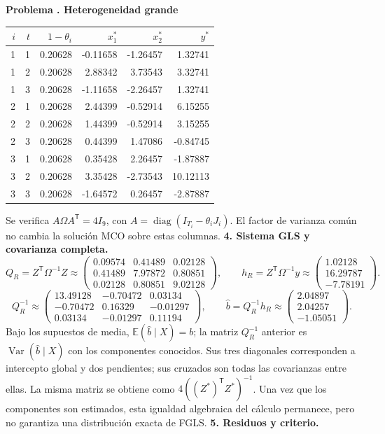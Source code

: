 \documentclass[11pt,a4paper]{article}
\newcommand{\E}{\mathbb E}
\newcommand{\T}{^{\mathsf T}}
\DeclareMathOperator{\Var}{Var}
\DeclareMathOperator{\diag}{diag}
\theoremstyle{definition}
\newcounter{problema}
\newenvironment{resuelto}[1]{\refstepcounter{problema}\par\medskip\Needspace{6\baselineskip}\textbf{Problema \theproblema. #1}\par}{\par\medskip}
\begin{document}
\begin{resuelto}{Heterogeneidad grande}
\begin{center}\small
\begin{tabular}{rrrrrr}
\toprule
$i$&$t$&$1-\theta_i$&$x_1^*$&$x_2^*$&$y^*$\\
\midrule
1&1&0.20628&-0.11658&-1.26457&1.32741\\
1&2&0.20628&2.88342&3.73543&3.32741\\
1&3&0.20628&-1.11658&-2.26457&1.32741\\
2&1&0.20628&2.44399&-0.52914&6.15255\\
2&2&0.20628&1.44399&-0.52914&3.15255\\
2&3&0.20628&0.44399&1.47086&-0.84745\\
3&1&0.20628&0.35428&2.26457&-1.87887\\
3&2&0.20628&3.35428&-2.73543&10.12113\\
3&3&0.20628&-1.64572&0.26457&-2.87887\\
\bottomrule
\end{tabular}
\end{center}
Se verifica $A\Omega A\T=4I_{9}$, con $A=\diag(I_{T_i}-\theta_iJ_i)$. El factor de varianza común no cambia la solución MCO sobre estas columnas.
\textbf{4. Sistema GLS y covarianza completa.}
\[
Q_R=Z\T\Omega^{-1}Z\approx\begin{pmatrix}
0.09574&0.41489&0.02128\\0.41489&7.97872&0.80851\\0.02128&0.80851&9.02128
\end{pmatrix},\qquad h_R=Z\T\Omega^{-1}y\approx\begin{pmatrix}
1.02128\\16.29787\\-7.78191
\end{pmatrix}.
\]
\[
Q_R^{-1}\approx\begin{pmatrix}
13.49128&-0.70472&0.03134\\-0.70472&0.16329&-0.01297\\0.03134&-0.01297&0.11194
\end{pmatrix},\qquad \widehat b=Q_R^{-1}h_R\approx\begin{pmatrix}
2.04897\\2.04257\\-1.05051
\end{pmatrix}.
\]
Bajo los supuestos de media, $\E(\widehat b\mid X)=b$; la matriz $Q_R^{-1}$ anterior es $\Var(\widehat b\mid X)$ con los componentes conocidos. Sus tres diagonales corresponden a intercepto global y dos pendientes; sus cruzados son todas las covarianzas entre ellas.
La misma matriz se obtiene como $4((Z^*)\T Z^*)^{-1}$. Una vez que los componentes son estimados, esta igualdad algebraica del cálculo permanece, pero no garantiza una distribución exacta de FGLS.
\textbf{5. Residuos y criterio.}


\end{resuelto}
\end{document}
